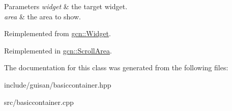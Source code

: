 \begin{DoxyParams}{Parameters}
{\em widget} & the target widget. \\
\hline
{\em area} & the area to show. \\
\hline
\end{DoxyParams}


Reimplemented from \hyperlink{classgcn_1_1Widget_ad360f89bfa3c4de1c7919a01b99e9f28}{gcn\+::\+Widget}.



Reimplemented in \hyperlink{classgcn_1_1ScrollArea_a44138b1de2eb2b0b5c6366f573fd15e6}{gcn\+::\+Scroll\+Area}.



The documentation for this class was generated from the following files\+:\begin{DoxyCompactItemize}
\item 
include/guisan/basiccontainer.\+hpp\item 
src/basiccontainer.\+cpp\end{DoxyCompactItemize}
